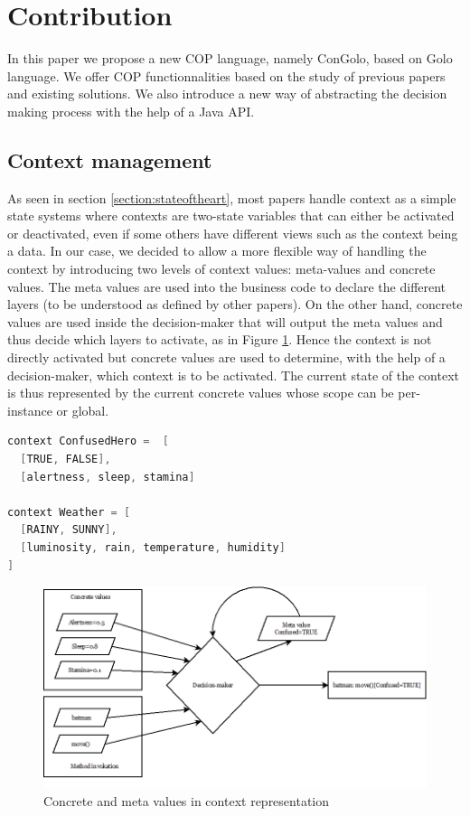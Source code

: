 \documentclass[a4paper]{article}
\begin{document}
  \section{Contribution}
\label{section:contribution}

In this paper we propose a new COP language, namely ConGolo, based on Golo language. We offer COP functionnalities based on the study of previous papers and existing solutions. We also introduce a new way of abstracting the decision making process with the help of a Java API.

\subsection{Context management}
\label{subsection:contextmanagement}

As seen in section \ref{section:stateoftheart}, most papers handle context as a simple state systems where contexts are two-state variables that can either be activated or deactivated, even if some others have different views such as the context being a data. In our case, we decided to allow a more flexible way of handling the context by introducing two levels of context values: meta-values and concrete values. The meta values are used into the business code to declare the different layers (to be understood as defined by other papers). On the other hand, concrete values are used inside the decision-maker that will output the meta values and thus decide which layers to activate, as in Figure \ref{figure:concretemetavalues}. Hence the context is not directly activated but concrete values are used to determine, with the help of a decision-maker, which context is to be activated. The current state of the context is thus represented by the current concrete values whose scope can be per-instance or global.

\begin{lstlisting}[float, language=Java, caption=ConGolo context example, label={listing:congolocontext}]
context ConfusedHero =  [
  [TRUE, FALSE],
  [alertness, sleep, stamina]

context Weather = [
  [RAINY, SUNNY],
  [luminosity, rain, temperature, humidity]
]
\end{lstlisting}

\begin{center}
\begin{figure}
\centering
\includegraphics[width=0.9\columnwidth]{images/concrete-meta-values.png}
\caption{Concrete and meta values in context representation}
\label{figure:concretemetavalues}
\end{figure}
\end{center}
\end{document}
